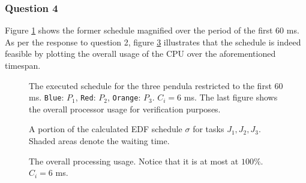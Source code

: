 \subsubsection{Question 4}

Figure \ref{fig:02.4.1.small} shows the former schedule magnified over the
period of the first 60 ms.
As per the response to question 2, figure \ref{fig:02.4.2} illustrates that the
schedule is indeed feasible by plotting the overall usage of the CPU over the
aforementioned timespan.


\begin{sidewaysfigure}

  \begin{figure}[H]\centering
    \scalebox{1}{}
    \caption{The executed schedule for the three pendula restricted to the first
        60 ms. \texttt{Blue}: $P_1$, \texttt{Red}: $P_2$,
        \texttt{Orange}: $P_3$. $C_i = 6$ ms. The last figure shows the overall
      processor usage for verification purposes.}
    \label{fig:02.4.1.small}
  \end{figure}

  \begin{figure}[H]\centering
    \scalebox{0.7}{}
    \caption{A portion of the calculated EDF schedule $\sigma$ for tasks
      $J_1, J_2, J_3$. Shaded areas denote the waiting time.}
    \label{fig:edf_6}
  \end{figure}

\end{sidewaysfigure}

\begin{figure}[H]\centering
  \scalebox{0.7}{}
  \caption{The overall processing usage. Notice that it is at most at $100\%$.
     $C_i = 6$ ms.}
    \label{fig:02.4.2}
\end{figure}
